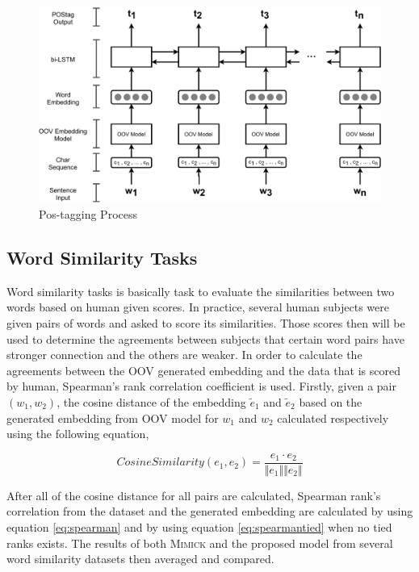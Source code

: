         \begin{figure}
            \centering
            \includegraphics[width=.8\linewidth]{images/postag.pdf}
            \caption{Pos-tagging Process}
            \label{fig:postag}
        \end{figure}
 
    \subsection{Word Similarity Tasks}
        Word similarity tasks is basically task to evaluate the
        similarities between two words based on human given scores. In
        practice, several human subjects were given pairs of words and
        asked to score its similarities. Those scores then will be
        used to determine the agreements between subjects that certain
        word pairs have stronger connection and the others are weaker.
        In order to calculate the agreements between the OOV generated
        embedding and the data that is scored by human, Spearman's
        rank correlation coefficient is used. Firstly, given a pair
        $(w_1, w_2)$, the cosine distance of the embedding
        $\tilde{e}_1$ and $\tilde{e}_2$ based on the generated
        embedding from OOV model for $w_1$ and $w_2$ calculated
        respectively using the following equation,

        \begin{equation}
            \label{eq:cosinesim}
            CosineSimilarity(e_1, e_2) = \frac{e_1 \cdot e_2}{\Vert e_1 \Vert \Vert e_2 \Vert}
        \end{equation}

        After all of the cosine distance for all pairs are calculated,
        Spearman rank's correlation from the dataset and the generated
        embedding are calculated by using equation \ref{eq:spearman}
        and by using equation \ref{eq:spearmantied} when no tied ranks
        exists. The results of both \textsc{Mimick} and the proposed
        model from several word similarity datasets then averaged and
        compared.
        
